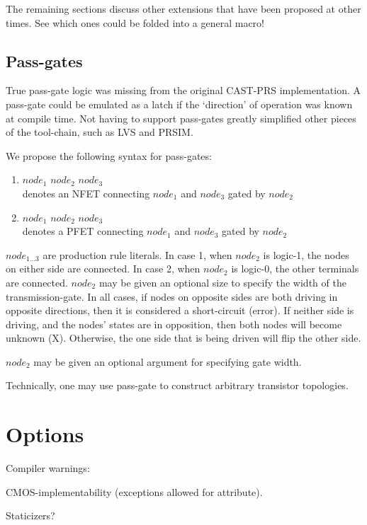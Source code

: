 The remaining sections discuss other extensions that have been proposed
at other times.  
See which ones could be folded into a general macro!

\subsection{Pass-gates}
\label{sec:prs:ext:passgates}

True pass-gate logic was missing from the original CAST-PRS implementation.  
A pass-gate could be emulated as a latch if the `direction' of operation was
known at compile time.  
Not having to support pass-gates greatly simplified other pieces of the 
tool-chain, such as LVS and PRSIM.  

We propose the following syntax for pass-gates:

\begin{enumerate}
\item $node_1$ \ttt{<-} $node_2$ \ttt{->} $node_3$\\
	denotes an NFET connecting $node_1$ and $node_3$ gated by $node_2$
\item $node_1$ \ttt{<+} $node_2$ \ttt{+>} $node_3$\\
	denotes a PFET connecting $node_1$ and $node_3$ gated by $node_2$
\end{enumerate}

$node_{1...3}$ are production rule literals.  
In case 1, when $node_2$ is logic-1, the nodes on either side are connected.
In case 2, when $node_2$ is logic-0, the other terminals are connected.  
$node_2$ may be given an optional size to specify the 
width of the transmission-gate.  
In all cases, 
if nodes on opposite sides are both driving in opposite directions, 
then it is considered a short-circuit (error).  
If neither side is driving, and the nodes' states are in opposition, 
then both nodes will become unknown (X). 
Otherwise, the one side that is being driven will flip the other side.  

$node_2$ may be given an optional  argument for specifying
gate width.  

Technically, one may use pass-gate to construct arbitrary transistor
topologies.  

\section{Options}
\label{sec:prs:options}

Compiler warnings:

CMOS-implementability (exceptions allowed for attribute).  

Staticizers?

